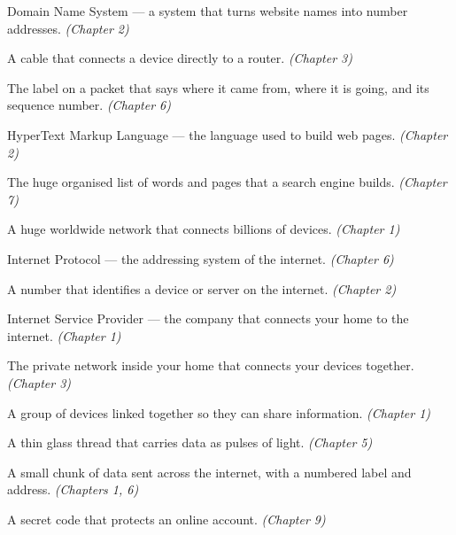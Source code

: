 \begin{tcolorbox}
\begin{description}[labelwidth=4cm, leftmargin=4.2cm, style=nextline, itemsep=0.45\baselineskip]
\item[\glossterm{DNS}]
Domain Name System — a system that turns website names into number addresses.
\emph{(Chapter 2)}

\item[\glossterm{Ethernet}]
A cable that connects a device directly to a router.
\emph{(Chapter 3)}

\item[\glossterm{Header}]
The label on a packet that says where it came from, where it is going, and its sequence number.
\emph{(Chapter 6)}

\item[\glossterm{HTML}]
HyperText Markup Language — the language used to build web pages.
\emph{(Chapter 2)}

\item[\glossterm{Index}]
The huge organised list of words and pages that a search engine builds.
\emph{(Chapter 7)}

\item[\glossterm{Internet}]
A huge worldwide network that connects billions of devices.
\emph{(Chapter 1)}

\item[\glossterm{IP}]
Internet Protocol — the addressing system of the internet.
\emph{(Chapter 6)}

\item[\glossterm{IP address}]
A number that identifies a device or server on the internet.
\emph{(Chapter 2)}

\item[\glossterm{ISP}]
Internet Service Provider — the company that connects your home to the internet.
\emph{(Chapter 1)}

\item[\glossterm{Local network}]
The private network inside your home that connects your devices together.
\emph{(Chapter 3)}

\item[\glossterm{Network}]
A group of devices linked together so they can share information.
\emph{(Chapter 1)}

\item[\glossterm{Optical fibre}]
A thin glass thread that carries data as pulses of light.
\emph{(Chapter 5)}

\item[\glossterm{Packet}]
A small chunk of data sent across the internet, with a numbered label and address.
\emph{(Chapters 1, 6)}

\item[\glossterm{Password}]
A secret code that protects an online account.
\emph{(Chapter 9)}


\end{description}
\end{tcolorbox}
